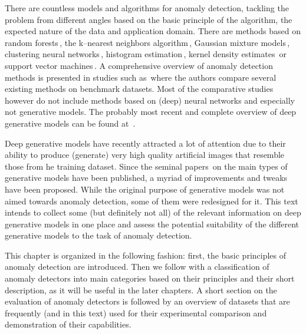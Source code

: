 There are countless models and algorithms for anomaly detection, tackling the problem from different angles based on the basic principle of the algorithm, the expected nature of the data and application domain. There are methods based on random forests\,\cite{liu2008isolation}, the k--nearest neighbors algorithm\,\cite{harmeling2006outliers}, Gaussian mixture models\,\cite{mahadevan2010anomaly}, clustering neural networks\,\cite{schlegl2017unsupervised}, histogram estimation\,\cite{pevny2016loda}, kernel density estimates\,\cite{latecki2007outlier} or support vector machines\,\cite{scholkopf2001estimating}. A comprehensive overview of anomaly detection methods is presented in studies such as\,\cite{pimentel2014review,goldstein2016comparative,lazarevic2003comparative,chandola2009anomaly,campos2016evaluation} where the authors compare several existing methods on benchmark datasets. Most of the comparative studies however do not include methods based
on (deep) neural networks and especially not generative models. The probably most recent and complete overview of deep generative models can be found at~\cite{ruff2020unifying}.

Deep generative models have recently attracted a lot of attention due to their ability to produce (generate) very high quality artificial images that resemble those from he training dataset. Since the seminal papers\,\cite{goodfellow2014gan,kingma2013vae,dinh2014nice} on the main types of generative models have been published, a myriad of improvements and tweaks have been proposed. While the original purpose of generative models was not aimed towards anomaly detection, some of them were redesigned for it. This text intends to collect some (but definitely not all) of the relevant information on deep generative models in one place and assess the potential suitability of the different generative models to the task of anomaly detection.

This chapter is organized in the following fashion: first, the basic principles of anomaly detection are introduced. Then we follow with a classification of anomaly detectors into main categories based on their principles and their short description, as it will be useful in the later chapters. A short section on the evaluation of anomaly detectors is followed by an overview of datasets that are frequently (and in this text) used for their experimental comparison and demonstration of their capabilities.

